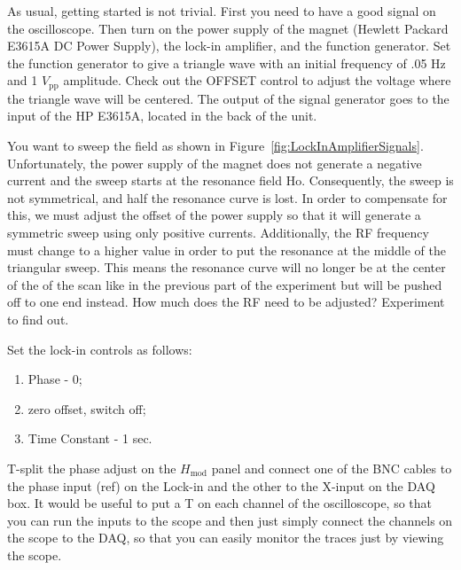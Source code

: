 \documentclass{../lab}
\begin{document}
As usual, getting started is not trivial. First you need to have a good signal on the oscilloscope. Then turn on the power supply of the magnet (Hewlett Packard E3615A DC Power Supply), the lock-in amplifier, and the function generator. Set the function generator to give a triangle wave with an initial frequency of .05 Hz and 1 $V_\text{pp}$ amplitude. Check out the OFFSET control to adjust the voltage where the triangle wave will be centered. The output of the signal generator goes to the input of the HP E3615A, located in the back of the unit.

You want to sweep the field as shown in Figure~\ref{fig:LockInAmplifierSignals}. Unfortunately, the power supply of the magnet does not generate a negative current and the sweep starts at the resonance field Ho. Consequently, the sweep is not symmetrical, and half the resonance curve is lost. In order to compensate for this, we must adjust the offset of the power supply so that it will generate a symmetric sweep using only positive currents. Additionally, the RF frequency must change to a higher value in order to put the resonance at the middle of the triangular sweep. This means the resonance curve will no longer be at the center of the of the scan like in the previous part of the experiment but will be pushed off to one end instead. How much does the RF need to be adjusted? Experiment to find out.

Set the lock-in controls as follows:

\begin{enumerate}
    \item Phase - 0;

    \item zero offset, switch off;

    \item Time Constant - 1 sec.
\end{enumerate}

T-split the phase adjust on the $H_\text{mod}$ panel and connect one of the BNC cables to the phase input (ref) on the Lock-in and the other to the X-input on the DAQ box. It would be useful to put a T on each channel of the oscilloscope, so that you can run the inputs to the scope and then just simply connect the channels on the scope to the DAQ, so that you can easily monitor the traces just by viewing the scope.
\end{document}
